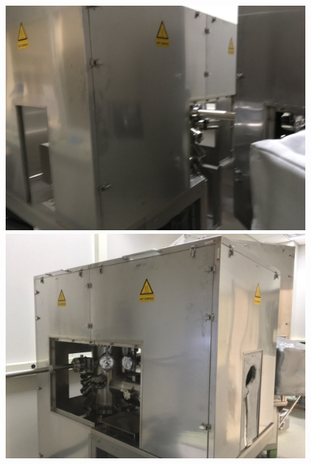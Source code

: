 \begin{enumerate}
\begin{figure}[H]
\begin{minipage}[c]{0.33\linewidth}
	\end{minipage}\hfill\vfill
	\begin{minipage}[c]{0.33\linewidth}
		\centering
		\includegraphics[width=1\textwidth]{panels4.jpg}
	\end{minipage}	\hfill %
	\begin{minipage}[c]{0.33\linewidth}
		\centering
		\includegraphics[width=1\textwidth]{panels5.jpg}
	\end{minipage}\hfill
	\begin{minipage}[c]{0.33\linewidth}
		\centering

\end{minipage}
\end{figure}
\end{enumerate}
